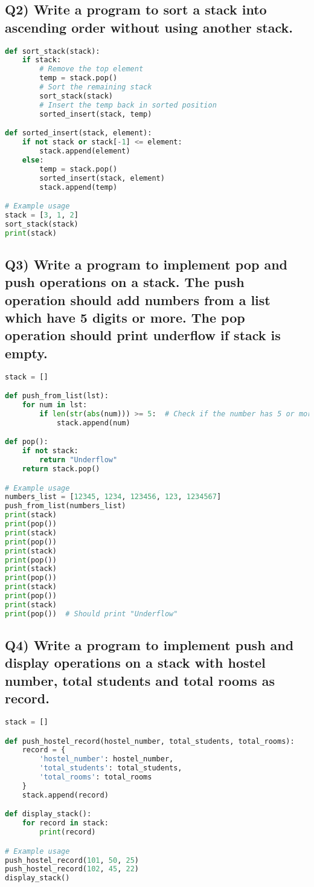 \documentclass{article}
\begin{document}
\subsection*{Q2) Write a program to sort a stack into ascending order without using another stack.}
\begin{lstlisting}[language=Python]
def sort_stack(stack):
    if stack:
        # Remove the top element
        temp = stack.pop()
        # Sort the remaining stack
        sort_stack(stack)
        # Insert the temp back in sorted position
        sorted_insert(stack, temp)

def sorted_insert(stack, element):
    if not stack or stack[-1] <= element:
        stack.append(element)
    else:
        temp = stack.pop()
        sorted_insert(stack, element)
        stack.append(temp)

# Example usage
stack = [3, 1, 2]
sort_stack(stack)
print(stack)
\end{lstlisting}

\subsection*{Q3) Write a program to implement pop and push operations on a stack. The push operation should add numbers from a list which have 5 digits or more. The pop operation should print underflow if stack is empty.}
\begin{lstlisting}[language=Python]
stack = []

def push_from_list(lst):
    for num in lst:
        if len(str(abs(num))) >= 5:  # Check if the number has 5 or more digits
            stack.append(num)

def pop():
    if not stack:
        return "Underflow"
    return stack.pop()

# Example usage
numbers_list = [12345, 1234, 123456, 123, 1234567]
push_from_list(numbers_list)
print(stack)
print(pop())
print(stack)
print(pop())
print(stack)
print(pop())
print(stack)
print(pop())
print(stack)
print(pop())
print(stack)
print(pop())  # Should print "Underflow"
\end{lstlisting}

\subsection*{Q4) Write a program to implement push and display operations on a stack with hostel number, total students and total rooms as record.}
\begin{lstlisting}[language=Python]
stack = []

def push_hostel_record(hostel_number, total_students, total_rooms):
    record = {
        'hostel_number': hostel_number,
        'total_students': total_students,
        'total_rooms': total_rooms
    }
    stack.append(record)

def display_stack():
    for record in stack:
        print(record)

# Example usage
push_hostel_record(101, 50, 25)
push_hostel_record(102, 45, 22)
display_stack()
\end{lstlisting}
\end{document}
